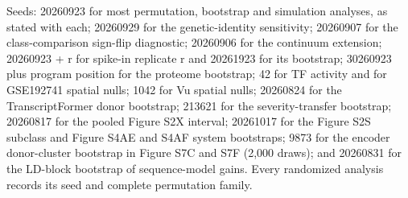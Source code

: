 Seeds: 20260923 for most permutation, bootstrap and simulation analyses, as stated with each; 20260929 for the genetic-identity sensitivity; 20260907 for the class-comparison sign-flip diagnostic; 20260906 for the continuum extension; 20260923 + r for spike-in replicate r and 20261923 for its bootstrap; 30260923 plus program position for the proteome bootstrap; 42 for TF activity and for GSE192741 spatial nulls; 1042 for Vu spatial nulls; 20260824 for the TranscriptFormer donor bootstrap; 213621 for the severity-transfer bootstrap; 20260817 for the pooled Figure S2X interval; 20261017 for the Figure S2S subclass and Figure S4AE and S4AF system bootstraps; 9873 for the encoder donor-cluster bootstrap in Figure S7C and S7F (2,000 draws); and 20260831 for the LD-block bootstrap of sequence-model gains. Every randomized analysis records its seed and complete permutation family.
